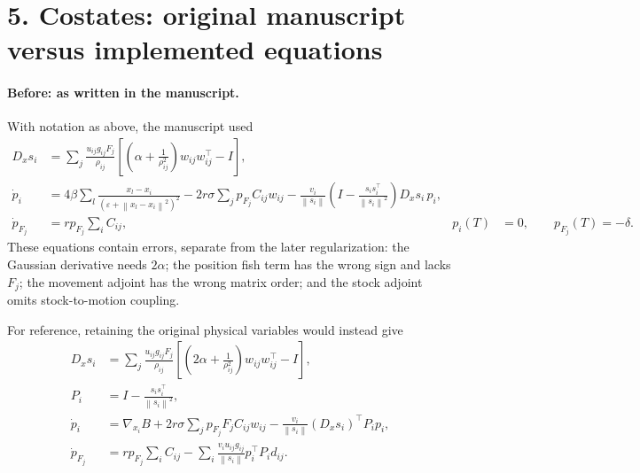 \documentclass[11pt]{article}
\newcommand{\norm}[1]{\left\lVert #1\right\rVert}
\begin{document}
\section*{5. Costates: original manuscript versus implemented equations}
\paragraph{Before: as written in the manuscript.}
With notation as above, the manuscript used
\begin{align}
D_xs_i
&=\sum_j\frac{u_{ij}g_{ij}F_j}{\rho_{ij}}
 \left[\left(\alpha+\frac{1}{\rho_{ij}^2}\right)
 w_{ij}w_{ij}^{\top}-I\right],\\
\dot p_i
&=4\beta\sum_l
 \frac{x_l-x_i}{(\varepsilon+\norm{x_l-x_i}^2)^2}
 -2r\sigma\sum_jp_{F_j}C_{ij}w_{ij}
 -\frac{v_i}{\norm{s_i}}
 \left(I-\frac{s_is_i^\top}{\norm{s_i}^2}\right)D_xs_i\,p_i,\\
\dot p_{F_j}&=rp_{F_j}\sum_iC_{ij},&
p_i(T)&=0,\qquad p_{F_j}(T)=-\delta.
\end{align}
These equations contain errors, separate from the later regularization:
the Gaussian derivative needs \(2\alpha\); the position fish term has
the wrong sign and lacks \(F_j\); the movement adjoint has the wrong
matrix order; and the stock adjoint omits stock-to-motion coupling.

For reference, retaining the original physical variables would instead give
\begin{align}
D_xs_i
&=\sum_j\frac{u_{ij}g_{ij}F_j}{\rho_{ij}}
 \left[\left(2\alpha+\frac{1}{\rho_{ij}^2}\right)
 w_{ij}w_{ij}^{\top}-I\right],\\
P_i&=I-\frac{s_is_i^\top}{\norm{s_i}^2},\\
\dot p_i
&=\nabla_{x_i}B
 +2r\sigma\sum_jp_{F_j}F_jC_{ij}w_{ij}
 -\frac{v_i}{\norm{s_i}}(D_xs_i)^\top P_i p_i,\\
\dot p_{F_j}
&=rp_{F_j}\sum_iC_{ij}
 -\sum_i\frac{v_i u_{ij}g_{ij}}{\norm{s_i}}p_i^\top P_id_{ij}.
\end{align}
\end{document}
